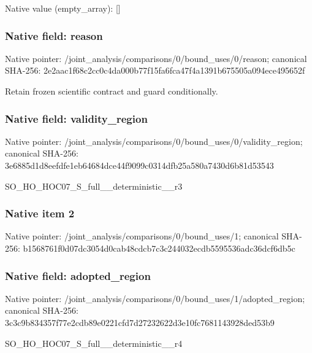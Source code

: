\documentclass[10pt,a4paper]{article}
\begin{document}
Native value (empty\_\allowbreak{}array): []

\subsubsection{Native field: reason}
Native pointer: /joint\_\allowbreak{}analysis/comparisons/0/bound\_\allowbreak{}uses/0/reason; canonical SHA-256: 2e2aac1f68c2cc0c4da000b77f15fa6fca47f4a1391b675505a094ece495652f

\begingroup\raggedright\sloppy Retain frozen scientific contract and guard conditionally.\par\endgroup

\subsubsection{Native field: validity\_\allowbreak{}region}
Native pointer: /joint\_\allowbreak{}analysis/comparisons/0/bound\_\allowbreak{}uses/0/validity\_\allowbreak{}region; canonical SHA-256: 3e6885d1d8eefdfe1eb64684dce44f9099c0314dfb25a580a7430d6b81d53543

\begingroup\raggedright\sloppy SO\_\allowbreak{}HO\_\allowbreak{}HOC07\_\allowbreak{}S\_\allowbreak{}full\_\allowbreak{}\_\allowbreak{}deterministic\_\allowbreak{}\_\allowbreak{}r3\par\endgroup

\subsubsection{Native item 2}
Native pointer: /joint\_\allowbreak{}analysis/comparisons/0/bound\_\allowbreak{}uses/1; canonical SHA-256: b1568761f0d07dc3054d0cab48cdcb7c3c244032ecdb5595536adc36dcf6db5c

\subsubsection{Native field: adopted\_\allowbreak{}region}
Native pointer: /joint\_\allowbreak{}analysis/comparisons/0/bound\_\allowbreak{}uses/1/adopted\_\allowbreak{}region; canonical SHA-256: 3c3c9b834357f77e2cdb89e0221cfd7d27232622d3e10fc7681143928ded53b9

\begingroup\raggedright\sloppy SO\_\allowbreak{}HO\_\allowbreak{}HOC07\_\allowbreak{}S\_\allowbreak{}full\_\allowbreak{}\_\allowbreak{}deterministic\_\allowbreak{}\_\allowbreak{}r4\par\endgroup
\end{document}
